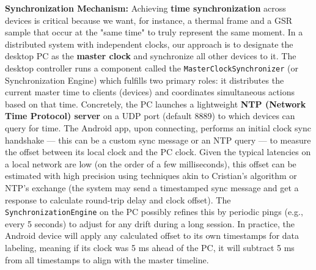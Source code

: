 \documentclass[11pt,a4paper]{report}
\begin{document}
\textbf{Synchronization Mechanism:} Achieving \textbf{time synchronization} across
devices is critical because we want, for instance, a thermal frame and a
GSR sample that occur at the "same time" to truly represent the same
moment. In a distributed system with independent clocks, our approach is
to designate the desktop PC as the \textbf{master clock} and synchronize all
other devices to it. The desktop controller runs a component called the
\texttt{MasterClockSynchronizer} (or Synchronization Engine) which fulfills two
primary roles: it distributes the current master time to clients
(devices) and coordinates simultaneous actions based on that time.
Concretely, the PC launches a lightweight \textbf{NTP (Network Time Protocol)
server} on a UDP port (default 8889) to which devices can query for
time.
The Android app, upon connecting, performs an initial clock sync
handshake --- this can be a custom sync message or an NTP query --- to
measure the offset between its local clock and the PC clock. Given the
typical latencies on a local network are low (on the order of a few
milliseconds), this offset can be estimated with high precision using
techniques akin to Cristian's algorithm or NTP's exchange (the system
may send a timestamped sync message and get a response to calculate
round-trip delay and clock
offset).
The \texttt{SynchronizationEngine} on the PC possibly refines this by periodic
pings (e.g., every 5 seconds) to adjust for any drift during a long
session.
In practice, the Android device will apply any calculated offset to its
own timestamps for data labeling, meaning if its clock was 5 ms ahead of
the PC, it will subtract 5 ms from all timestamps to align with the
master timeline.
\end{document}
